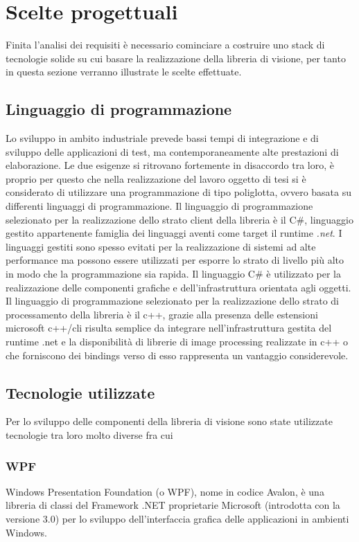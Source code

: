 \section{Scelte progettuali}
\label{sec:scelte-progettuali}

Finita l'analisi dei requisiti è necessario cominciare a costruire uno stack di tecnologie solide su cui basare la realizzazione della libreria di visione, per tanto in questa sezione verranno illustrate le scelte effettuate.

\subsection{Linguaggio di programmazione}

Lo sviluppo in ambito industriale prevede bassi tempi di integrazione e di sviluppo delle applicazioni di test, ma contemporaneamente alte prestazioni di elaborazione. Le due esigenze si ritrovano fortemente in disaccordo tra loro, è proprio per questo che nella realizzazione del lavoro oggetto di tesi si è considerato di utilizzare una programmazione di tipo poliglotta, ovvero basata su differenti linguaggi di programmazione.
Il linguaggio di programmazione selezionato per la realizzazione dello strato client della libreria è il C\#, linguaggio gestito appartenente famiglia dei linguaggi aventi come target il runtime \emph{.net}. I linguaggi gestiti sono spesso evitati per la realizzazione di sistemi ad alte performance ma  possono essere utilizzati per esporre lo strato di livello più alto in modo che la programmazione sia rapida. Il linguaggio C\#  è utilizzato per la realizzazione delle componenti grafiche e dell'infrastruttura orientata agli oggetti.
Il linguaggio di programmazione selezionato per la realizzazione dello strato di processamento della libreria è il c++, grazie alla presenza delle estensioni microsoft c++/cli risulta semplice da integrare nell'infrastruttura gestita del runtime .net e la disponibilità di librerie di image processing realizzate in c++ o che forniscono dei bindings verso di esso rappresenta un vantaggio considerevole.

\subsection{Tecnologie utilizzate}

Per lo sviluppo delle componenti della libreria di visione sono state utilizzate tecnologie tra loro molto diverse fra cui

\subsubsection{WPF}
Windows Presentation Foundation (o WPF), nome in codice Avalon, è una libreria di classi del Framework .NET proprietarie Microsoft (introdotta con la versione 3.0) per lo sviluppo dell'interfaccia grafica delle applicazioni in ambienti Windows.

